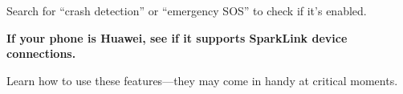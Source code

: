 
Search for “crash detection” or “emergency SOS” to check if it's enabled.

\textbf{If your phone is Huawei, see if it supports SparkLink device connections.}\par

Learn how to use these features—they may come in handy at critical moments.
